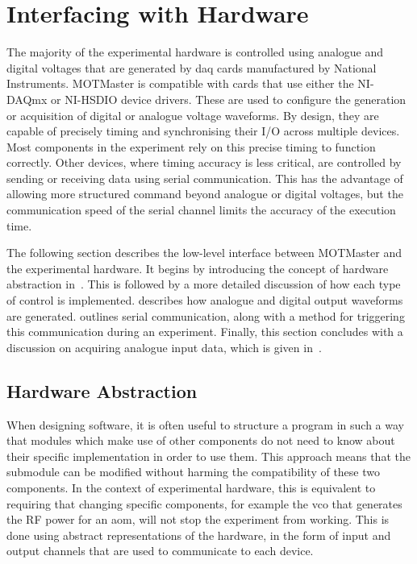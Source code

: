 \section{Interfacing with Hardware}\label{sec:mm_interface}

The majority of the experimental hardware is controlled using analogue and
digital voltages that are generated by \ac{daq} cards manufactured by
National Instruments. MOTMaster is compatible with cards that use either the
NI-DAQmx or NI-HSDIO device drivers. These are used to configure the
generation or acquisition of digital or analogue voltage waveforms. By design, they are
capable of precisely timing and synchronising their I/O across multiple
devices. Most components in the experiment rely on this precise timing to
function correctly. Other devices, where timing accuracy is less critical,
are controlled by sending or receiving data using serial communication. This
has the advantage of allowing more structured command beyond analogue or
digital voltages, but the communication speed of the serial channel limits
the accuracy of the execution time. \par\noindent
The following section describes the low-level interface between MOTMaster and the experimental hardware. It begins by introducing the concept of hardware abstraction in~. This is followed by a more detailed discussion of how each type of control is implemented.  describes how analogue and digital output waveforms are generated.  outlines serial communication, along with a method for triggering this communication during an experiment. Finally, this section concludes with a discussion on acquiring analogue input data, which is given in~.

\subsection{Hardware Abstraction}\label{subsec:compinterface_hwabstraction}
When designing software, it is often useful to structure a program in such a
way that modules which make use of other components do not need to know about
their specific implementation in order to use them. This approach means that the submodule can be modified without harming the
compatibility of these two components. In the context of experimental
hardware, this is equivalent to requiring that changing specific components,
for example the \ac{vco} that generates the RF power for an \ac{aom}, will
not stop the experiment from working. This is done using abstract
representations of the hardware, in the form of input and output channels
that are used to communicate to each device. 
